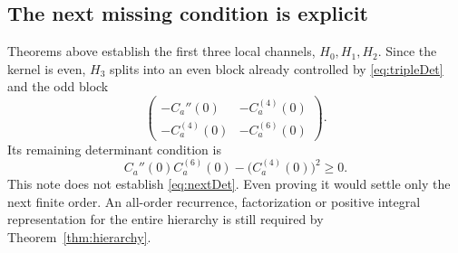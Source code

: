 \subsection{The next missing condition is explicit}
Theorems above establish the first three local channels, $H_0,H_1,H_2$. Since the kernel is even, $H_3$ splits into an even block already controlled by \eqref{eq:tripleDet} and the odd block
\[
\begin{pmatrix}
-C_a''(0)&-C_a^{(4)}(0)\\
-C_a^{(4)}(0)&-C_a^{(6)}(0)
\end{pmatrix}.
\]
Its remaining determinant condition is
\begin{equation}\label{eq:nextDet}
\boxed{C_a''(0)C_a^{(6)}(0)-\bigl(C_a^{(4)}(0)\bigr)^2\ge0.}
\end{equation}
This note does not establish \eqref{eq:nextDet}. Even proving it would settle only the next finite order. An all-order recurrence, factorization or positive integral representation for the entire hierarchy is still required by Theorem~\ref{thm:hierarchy}.
